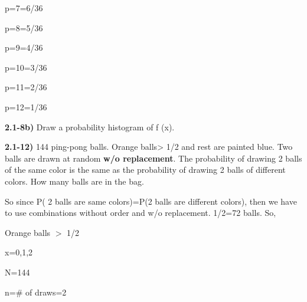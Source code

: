 \documentclass{article}
\begin{document}
p=7=6/36

\vspace{2mm}

p=8=5/36

\vspace{2mm}

p=9=4/36

\vspace{2mm}

p=10=3/36

\vspace{2mm}

p=11=2/36

\vspace{2mm}

p=12=1/36




\newpage
\textbf{2.1-8b)} Draw a probability histogram of f (x).

\vspace{4mm}




 

\newpage
\textbf{2.1-12)} 144 ping-pong balls. Orange balls> 1/2 and rest are painted blue. Two balls are drawn at random \textbf{w/o replacement}. The probability of drawing 2 balls of the same color is the same as the probability of drawing 2 balls of different colors. How many balls are in the bag.

\vspace{2mm}

So since P( 2 balls are same colors)=P(2 balls are different colors), then we have to use combinations without order and w/o replacement. 1/2=72 balls. So,

\vspace{2mm}

Orange balls $>$ 1/2

\vspace{2mm}

x=0,1,2

\vspace{2mm}

N=144
\vspace{2mm}

n=\# of draws=2
\vspace{2mm}
\end{document}
